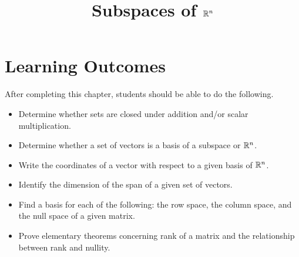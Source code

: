 \documentclass{ximera}
\title{Subspaces of $\mathbb{R}^n$}
\begin{document}
\begin{abstract}

\end{abstract}
 
\maketitle
 
\section*{Learning Outcomes}
After completing this chapter, students should be able to do the following.
 
\begin{itemize}
    \item Determine whether sets are closed under addition and/or scalar multiplication.
    \item Determine whether a set of vectors is a basis of a subspace or $\mathbb{R}^n$.
    \item Write the coordinates of a vector with respect to a given basis of $\mathbb{R}^n$.
    \item Identify the dimension of the span of a given set of vectors.   
    \item Find a basis for each of the following: the row space, the column space, and the null space of a given matrix.
    \item  Prove elementary theorems concerning rank of a matrix and the relationship between rank and nullity.
 
\end{itemize}

 
\end{document}
